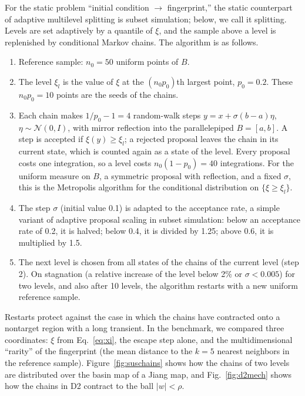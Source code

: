 For the static problem ``initial condition $\to$ fingerprint,'' the static counterpart of adaptive multilevel splitting\cite{CerouGuyader2007} is subset simulation;\cite{AuBeck2001} below, we call it splitting. Levels are set adaptively by a quantile of $\xi$, and the sample above a level is replenished by conditional Markov chains. The algorithm is as follows.
\begin{enumerate}
\item Reference sample: $n_0=50$ uniform points of $B$.
\item The level $\xi_l$ is the value of $\xi$ at the $(n_0p_0)$th largest point, $p_0=0.2$. These $n_0p_0=10$ points are the seeds of the chains.
\item Each chain makes $1/p_0-1=4$ random-walk steps $y=x+\sigma(b-a)\eta$, $\eta\sim\mathcal{N}(0,I)$, with mirror reflection into the parallelepiped $B=[a,b]$. A step is accepted if $\xi(y)\ge\xi_l$; a rejected proposal leaves the chain in its current state, which is counted again as a state of the level. Every proposal costs one integration, so a level costs $n_0(1-p_0)=40$ integrations. For the uniform measure on $B$, a symmetric proposal with reflection, and a fixed $\sigma$, this is the Metropolis algorithm for the conditional distribution on $\{\xi\ge\xi_l\}$.
\item The step $\sigma$ (initial value 0.1) is adapted to the acceptance rate, a simple variant of adaptive proposal scaling in subset simulation:\cite{Papaioannou2015} below an acceptance rate of 0.2, it is halved; below 0.4, it is divided by 1.25; above 0.6, it is multiplied by 1.5.
\item The next level is chosen from all states of the chains of the current level (step 2). On stagnation (a relative increase of the level below 2\% or $\sigma<0.005$) for two levels, and also after 10 levels, the algorithm restarts with a new uniform reference sample.
\end{enumerate}
Restarts protect against the case in which the chains have contracted onto a nontarget region with a long transient. In the benchmark, we compared three coordinates: $\xi$ from Eq.~\eqref{eq:xi}, the escape step alone, and the multidimensional ``rarity'' of the fingerprint (the mean distance to the $k=5$ nearest neighbors in the reference sample). Figure~\ref{fig:suschains} shows how the chains of two levels are distributed over the basin map of a Jiang map, and Fig.~\ref{fig:d2mech} shows how the chains in D2 contract to the ball $|w|<\rho$.

